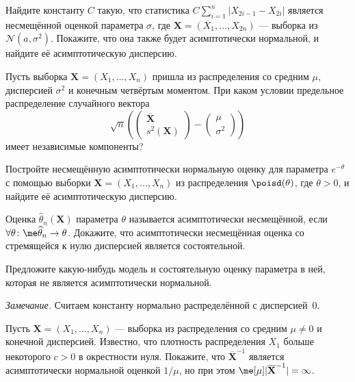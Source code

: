\begin{problem}
	Найдите константу $C$ такую, что статистика $C\sum_{i=1}^n |X_{2i-1} - X_{2i}|$ является несмещённой оценкой параметра $\sigma$, где $\mathbf X = (X_1, \ldots, X_{2n})$ --- выборка из $\mathcal{N}(a, \sigma^2)$. Покажите, что она также будет асимптотически нормальной, и найдите её асимптотическую дисперсию.
\end{problem}

\begin{problem}\label{emp_mean_and_var_are_almost_ind}
	Пусть выборка $\mathbf X = (X_1, \ldots, X_n)$ пришла из распределения со средним $\mu$, дисперсией $\sigma^2$ и конечным четвёртым моментом. При каком условии предельное распределение случайного вектора
\[
\sqrt{n}\left(
\begin{pmatrix}
	\overline{\mathbf X}\\
	s^2(\mathbf X)
\end{pmatrix}
-
\begin{pmatrix}
	\mu\\
	\sigma^2
\end{pmatrix}
\right)
\]
имеет независимые компоненты?
\end{problem}

\begin{problem}\label{unbiased-est-for-exp}
	Постройте несмещённую асимптотически нормальную оценку для параметра $e^{-\theta}$ с помощью выборки $\mathbf X = (X_1, \ldots, X_n)$ из распределения $\poisd(\theta)$, где $\theta > 0$, и найдите её асимптотическую дисперсию.
\end{problem}

\begin{problem}
	Оценка $\widehat{\theta}_n(\mathbf X)$ параметра $\theta$ называется $\textit{асимптотически несмещённой}$, если $\forall \theta\colon \me \widehat{\theta}_n \to \theta$. Докажите, что асимптотически несмещённая оценка со стремящейся к нулю дисперсией является состоятельной.
\end{problem}

\begin{problem}
	Предложите какую-нибудь модель и состоятельную оценку параметра в ней, которая не является асимптотически нормальной.

\textit{Замечание.} Считаем константу нормально распределённой с дисперсией~$0$.
\end{problem}

\begin{problem}
	Пусть $\mathbf X = (X_1, \ldots, X_n)$ --- выборка из распределения со средним $\mu \ne 0$ и конечной дисперсией. Известно, что плотность распределения $X_1$ больше некоторого $c > 0$ в окрестности нуля. Покажите, что $\overline{\mathbf X}^{-1}$ является асимптотически нормальной оценкой $1/\mu$, но при этом $\me[\mu] |\overline{\mathbf X}^{-1}| = \infty$.
\end{problem}

